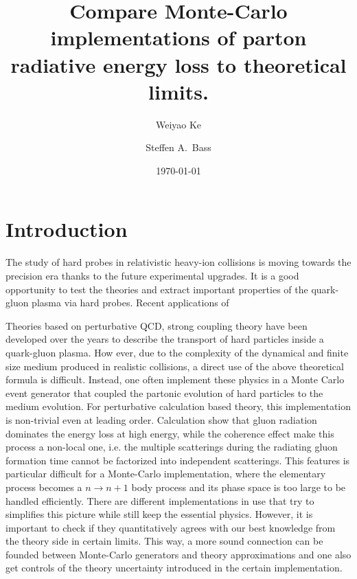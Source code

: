 \documentclass[aps, prc, reprint, amsmath, groupedaddress, nofootinbib]{revtex4-1}
\begin{document}
\title{Compare Monte-Carlo implementations of parton radiative energy loss to theoretical limits.}
\author{Weiyao Ke}
\author{Steffen A.\ Bass}
\date{\today}
\maketitle

\section{Introduction}
The study of hard probes in relativistic heavy-ion collisions is moving towards the precision era thanks to the future experimental upgrades.
It is a good opportunity to test the theories and extract important properties of the quark-gluon plasma via hard probes.
Recent applications of 

Theories based on perturbative QCD, strong coupling theory have been developed over the years to describe the transport of hard particles inside a quark-gluon plasma.
How ever, due to the complexity of the dynamical and finite size medium produced in realistic collisions, a direct use of the above theoretical formula is difficult. 
Instead, one often implement these physics in a Monte Carlo event generator that coupled the partonic evolution of hard particles to the medium evolution.
For perturbative calculation based theory, this implementation is non-trivial even at leading order.
Calculation show that gluon radiation dominates the energy loss at high energy, while the coherence effect make this process a non-local one, i.e.  the multiple scatterings during the radiating gluon formation time cannot be factorized into independent scatterings.
This features is particular difficult for a Monte-Carlo implementation, where the elementary process becomes a $n\rightarrow n+1$ body process and its phase space is too large to be handled efficiently.
There are different implementations in use that try to simplifies this picture while still keep the essential physics.
However, it is important to check if they quantitatively agrees with our best knowledge from the theory side in certain limits.
This way, a more sound connection can be founded between Monte-Carlo generators and theory approximations and one also get controls of the theory uncertainty introduced in the certain implementation.
\end{document}
